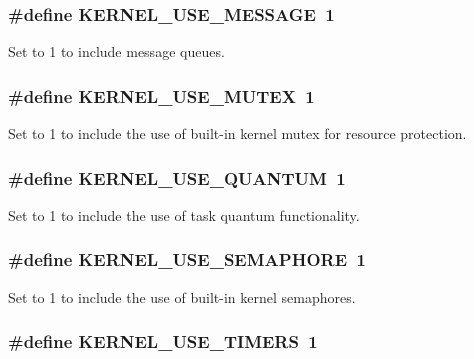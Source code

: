 \subsubsection[{KERNEL\_\-USE\_\-MESSAGE}]{\setlength{\rightskip}{0pt plus 5cm}\#define KERNEL\_\-USE\_\-MESSAGE~1}\label{kernelcfg_8h_a04488e3d59539920a192eb0a9a3bf7e8}


Set to 1 to include message queues. 
\subsubsection[{KERNEL\_\-USE\_\-MUTEX}]{\setlength{\rightskip}{0pt plus 5cm}\#define KERNEL\_\-USE\_\-MUTEX~1}\label{kernelcfg_8h_a450c202ab77fbb469910ad535a3d4a90}


Set to 1 to include the use of built-\/in kernel mutex for resource protection. 
\subsubsection[{KERNEL\_\-USE\_\-QUANTUM}]{\setlength{\rightskip}{0pt plus 5cm}\#define KERNEL\_\-USE\_\-QUANTUM~1}\label{kernelcfg_8h_a67a168f6a8baa1a05cee3a6a41e49000}


Set to 1 to include the use of task quantum functionality. 
\subsubsection[{KERNEL\_\-USE\_\-SEMAPHORE}]{\setlength{\rightskip}{0pt plus 5cm}\#define KERNEL\_\-USE\_\-SEMAPHORE~1}\label{kernelcfg_8h_af52b8902ecbf7599a0cc218b11d409e8}


Set to 1 to include the use of built-\/in kernel semaphores. 
\subsubsection[{KERNEL\_\-USE\_\-TIMERS}]{\setlength{\rightskip}{0pt plus 5cm}\#define KERNEL\_\-USE\_\-TIMERS~1}\label{kernelcfg_8h_a981eb1efb1bdec713aac92893a6cf277}


